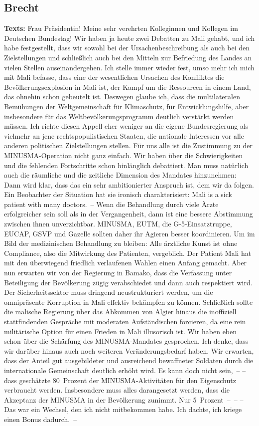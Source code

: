 \documentclass{article}
\begin{document}
\subsection{Brecht}
\noindent\textbf{Texts:} Frau Präsidentin! Meine sehr verehrten Kolleginnen und Kollegen im Deutschen Bundestag! Wir haben ja heute zwei Debatten zu Mali gehabt, und ich habe festgestellt, dass wir sowohl bei der Ursachenbeschreibung als auch bei den Zielstellungen und schließlich auch bei den Mitteln zur Befriedung des Landes an vielen Stellen auseinandergehen. Ich stelle immer wieder fest, umso mehr ich mich mit Mali befasse, dass eine der wesentlichen Ursachen des Konfliktes die Bevölkerungsexplosion in Mali ist, der Kampf um die Ressourcen in einem Land, das ohnehin schon gebeutelt ist. Deswegen glaube ich, dass die multilateralen Bemühungen der Weltgemeinschaft für Klimaschutz, für Entwicklungshilfe, aber insbesondere für das Weltbevölkerungsprogramm deutlich verstärkt werden müssen. Ich richte diesen Appell eher weniger an die eigene Bundesregierung als vielmehr an jene rechtspopulistischen Staaten, die nationale Interessen vor alle anderen politischen Zielstellungen stellen.  Für uns alle ist die Zustimmung zu der MINUSMA-Operation nicht ganz einfach. Wir haben über die Schwierigkeiten und die fehlenden Fortschritte schon hinlänglich debattiert. Man muss natürlich auch die räumliche und die zeitliche Dimension des Mandates hinzunehmen: Dann wird klar, dass das ein sehr ambitionierter Anspruch ist, dem wir da folgen. Ein Beobachter der Situation hat sie ironisch charakterisiert: Mali is a sick patient with many doctors. – Wenn die Behandlung durch viele Ärzte erfolgreicher sein soll als in der Vergangenheit, dann ist eine bessere Abstimmung zwischen ihnen unverzichtbar. MINUSMA, EUTM, die G‑5-Einsatztruppe, EUCAP, GSVP und Gazelle sollten daher ihr Agieren besser koordinieren. Um im Bild der medizinischen Behandlung zu bleiben: Alle ärztliche Kunst ist ohne Compliance, also die Mitwirkung des Patienten, vergeblich. Der Patient Mali hat mit den überwiegend friedlich verlaufenen Wahlen einen Anfang gemacht. Aber nun erwarten wir von der Regierung in Bamako, dass die Verfassung unter Beteiligung der Bevölkerung zügig verabschiedet und dann auch respektiert wird. Der Sicherheitssektor muss dringend neustrukturiert werden, um die omnipräsente Korruption in Mali effektiv bekämpfen zu können. Schließlich sollte die malische Regierung über das Abkommen von Algier hinaus die inoffiziell stattfindenden Gespräche mit moderaten Aufständischen forcieren, da eine rein militärische Option für einen Frieden in Mali illusorisch ist. Wir haben eben schon über die Schärfung des MINUSMA-Mandates gesprochen. Ich denke, dass wir darüber hinaus auch noch weiteren Veränderungsbedarf haben. Wir erwarten, dass der Anteil gut ausgebildeter und ausreichend bewaffneter Soldaten durch die internationale Gemeinschaft deutlich erhöht wird. Es kann doch nicht sein, – – dass geschätzte 80 Prozent der MINUSMA-Aktivitäten für den Eigenschutz verbraucht werden. Insbesondere muss alles darangesetzt werden, dass die Akzeptanz der MINUSMA in der Bevölkerung zunimmt. Nur 5 Prozent – –  – Das war ein Wechsel, den ich nicht mitbekommen habe.  Ich dachte, ich kriege einen Bonus dadurch. – 
\end{document}
